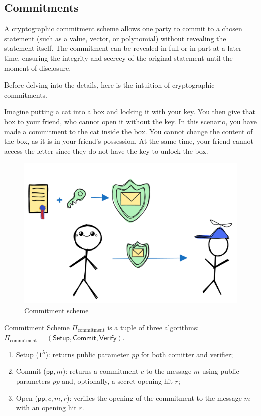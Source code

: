 \documentclass[../lecture-notes.tex]{subfiles}
\begin{document}
\subsection{Commitments}

\begin{definition}
    A cryptographic commitment scheme allows one party to commit to a chosen statement (such as a value, vector, or polynomial) without revealing the statement itself. The commitment can be revealed in full or in part at a later time, ensuring the integrity and secrecy of the original statement until the moment of disclosure.
\end{definition}

Before delving into the details, here is the intuition of cryptographic commitments.

Imagine putting a cat into a box and locking it with your key. 
You then give that box to your friend, who cannot open it without the key.
In this scenario, you have made a commitment to the cat inside the box. 
You cannot change the content of the box, as it is in your friend's possession. 
At the same time, your friend cannot access the letter since they do not have the key to unlock the box.

\begin{figure}[H]
    \centering
    \includegraphics[width=0.5\linewidth, clip]{images/lecture_5/CommitmentExample.png}

    \caption{Commitment scheme}
\end{figure}

\begin{definition}
    
    Commitment Scheme $\Pi_{\text{commitment}}$ is a tuple of three algorithms: $\Pi_{\text{commitment}} = (\mathsf{Setup}, \mathsf{Commit}, \mathsf{Verify})$.

    \begin{enumerate}

        \item Setup ($1^{\lambda}$): returns public parameter \textit{pp} for both comitter and verifier;

        \item  Commit ($\mathsf{pp}, m$): returns a commitment $c$ to the message $m$ using public parameters \textit{pp} and, optionally, a secret opening hit $r$;

        \item  Open ($\mathsf{pp}, c, m, r$): verifies the opening of the commitment to the message $m$ with an opening hit $r$. 
    \end{enumerate}
\end{definition}
\end{document}
